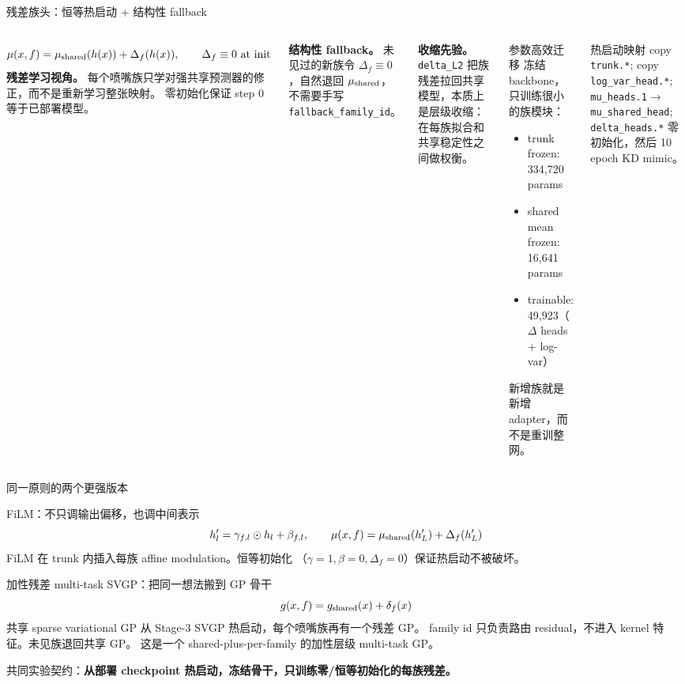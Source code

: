 \documentclass[UTF8,aspectratio=169]{ctexbeamer}
\newcommand{\good}[1]{\textcolor{green!45!black}{#1}}
\begin{document}
\begin{frame}{残差族头：恒等热启动 + 结构性 fallback}
\small
\begin{columns}[T]
\[
  \mu(x,f)=\mu_{\rm shared}(h(x))+\Delta_f(h(x)),\qquad
  \Delta_f\equiv0\ \text{at init}
\]
\textbf{残差学习视角。} 每个喷嘴族只学对强共享预测器的修正，而不是重新学习整张映射。
零初始化保证 step 0 等于已部署模型。

\vspace{0.25em}
\textbf{结构性 fallback。} 未见过的新族令 $\Delta_f\equiv0$，自然退回
$\mu_{\rm shared}$，不需要手写 \texttt{fallback\_family\_id}。

\vspace{0.25em}
\textbf{收缩先验。} \texttt{delta\_L2} 把族残差拉回共享模型，本质上是层级收缩：
在每族拟合和共享稳定性之间做权衡。

\footnotesize
\begin{block}{参数高效迁移}
冻结 backbone，只训练很小的族模块：
\begin{itemize}\setlength\itemsep{1pt}
  \item trunk frozen: 334{,}720 params
  \item shared mean frozen: 16{,}641 params
  \item \good{trainable: 49{,}923}（$\Delta$ heads + log-var）
\end{itemize}
新增族就是新增 adapter，而不是重训整网。
\end{block}

\begin{block}{热启动映射}
\scriptsize
copy \texttt{trunk.*}; copy \texttt{log\_var\_head.*};
\texttt{mu\_heads.1}$\to$\texttt{mu\_shared\_head};
\texttt{delta\_heads.*} 零初始化，然后 10 epoch KD mimic。
\end{block}
\end{columns}
\end{frame}

\begin{frame}{同一原则的两个更强版本}
\small
\begin{block}{FiLM：不只调输出偏移，也调中间表示}
\[
  h_l'=\gamma_{f,l}\odot h_l+\beta_{f,l},\qquad
  \mu(x,f)=\mu_{\rm shared}(h_L')+\Delta_f(h_L')
\]
FiLM 在 trunk 内插入每族 affine modulation。恒等初始化
（$\gamma=1,\beta=0,\Delta_f=0$）保证热启动不被破坏。
\end{block}

\begin{block}{加性残差 multi-task SVGP：把同一想法搬到 GP 骨干}
\[
  g(x,f)=g_{\rm shared}(x)+\delta_f(x)
\]
共享 sparse variational GP 从 Stage-3 SVGP 热启动，每个喷嘴族再有一个残差 GP。
family id 只负责路由 residual，不进入 kernel 特征。未见族退回共享 GP。
这是一个 shared-plus-per-family 的加性层级 multi-task GP。
\end{block}

\vspace{0.2em}
\footnotesize
共同实验契约：\textbf{从部署 checkpoint 热启动，冻结骨干，只训练零/恒等初始化的每族残差。}
\end{frame}
\end{document}

